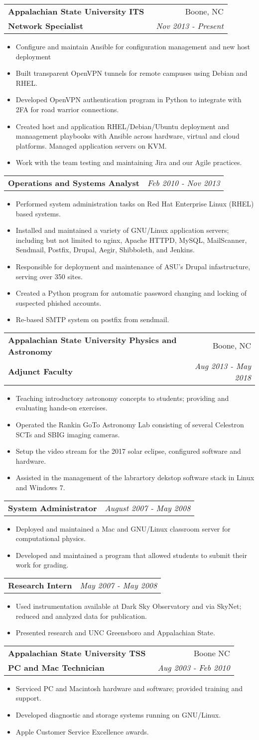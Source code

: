 \documentclass[letterpaper,11pt]{article}
\makeatletter
\newcommand{\resumeItem}[1]{
	\item\small{
		{#1}
	}
}
\newcommand{\resumeSubheading}[4]{
  \vspace{1pt}\item[]
    \begin{tabular*}{0.95\textwidth}[t]{l@{\extracolsep{\fill}}r}
      \textbf{#1} & #2 \\
      \textbf{\small#3} & \textit{\ #4} \\
    \end{tabular*}\vspace{-5pt}
}
\newcommand{\resumeSubSubheading}[2]{
    \begin{tabular*}{0.97\textwidth}{l@{\extracolsep{\fill}}r}
      \textbf{\small#1} & \textit{\small #2} \\
    \end{tabular*}\vspace{-5pt}
}
\newcommand{\resumeItemListStart}{\begin{itemize}}
\newcommand{\resumeItemListEnd}{\end{itemize}\vspace{-5pt}}
\makeatother
\begin{document}
    \resumeSubheading
      {Appalachian State University ITS}{Boone, NC}
      {Network Specialist}  {Nov 2013 - Present}
      \resumeItemListStart
        \resumeItem{Configure and maintain Ansible for configuration management and new host deployment}
        \resumeItem{Built transparent OpenVPN tunnels for remote campuses using Debian and RHEL.}
        \resumeItem{Developed OpenVPN authentication program in Python to integrate with 2FA for road warrior connections.}
        \resumeItem{Created host and application RHEL/Debian/Ubuntu deployment and manaagement playbooks with Ansible across hardware, virtual and cloud platforms. Managed application servers on KVM.}
        \resumeItem{Work with the team testing and maintaining Jira and our Agile practices.}
      \resumeItemListEnd       
    \resumeSubSubheading
     {Operations and Systems Analyst}{Feb 2010 - Nov 2013}
    \resumeItemListStart
       \resumeItem{Performed system administration tasks on Red Hat Enterprise Linux (RHEL) based systems.}
       \resumeItem{Installed and maintained a variety of GNU/Linux application servers; including but not limited to nginx, Apache HTTPD, MySQL, MailScanner, Sendmail, Postfix, Drupal, Aegir, Shibboleth, and Jenkins.}
       \resumeItem{Responsible for deployment and maintenance of ASU's Drupal infastructure, serving over 350 sites.}
       \resumeItem{Created a Python program for automatic password changing and locking of suspected phished accounts.}
       \resumeItem{Re-based SMTP system on postfix from sendmail.}
   \resumeItemListEnd
	\resumeSubheading
	{Appalachian State University Physics and Astronomy}{Boone, NC}
	{Adjunct Faculty}  {Aug 2013 - May 2018}
	\resumeItemListStart
	 \resumeItem{Teaching introductory astronomy concepts to students; providing and evaluating hands-on exercises.}
	 \resumeItem{Operated the Rankin GoTo Astronomy Lab consisting of several Celestron SCTs and SBIG imaging cameras.}
	 \resumeItem{Setup the video stream for the 2017 solar eclipse, configured software and hardware.}
	\resumeItem{Assisted in the management of the labrartory dekstop software stack in Linux and Windows 7.}
	 \resumeItemListEnd
	 \resumeSubSubheading
	 {System Administrator}{August 2007 - May 2008}
	 \resumeItemListStart
	 \resumeItem{Deployed and maintained a Mac and GNU/Linux classroom server for computational physics.}
	 \resumeItem{Developed and maintained a program that allowed students to submit their work for grading.}
	 \resumeItemListEnd
	 \resumeSubSubheading
	 {Research Intern}{May 2007 - May 2008}
	 \resumeItemListStart
	 \resumeItem{Used instrumentation available at Dark Sky Observatory and via SkyNet; reduced and analyzed data for publication.}
	 \resumeItem{Presented research and UNC Greensboro and Appalachian State.}
	 \resumeItemListEnd
	 \resumeSubheading
	 {Appalachian State University TSS}{Boone NC}
	 {PC and Mac Technician}{Aug 2003 - Feb 2010}
	 \resumeItemListStart
	 \resumeItem{Serviced PC and Macintosh hardware and software; provided training and support.}
	 \resumeItem{Developed diagnostic and storage systems running on GNU/Linux.}
	 \resumeItem{Apple Customer Service Excellence awards.}
	 \resumeItemListEnd
	 
\end{document}
